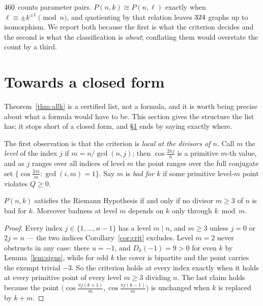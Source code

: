 \begin{remark}
$460$ counts parameter pairs. $P(n,k)\cong P(n,\ell)$ exactly when
$\ell\equiv\pm k^{\pm1}\pmod n$, and quotienting by that relation leaves
$324$ graphs up to isomorphism. We report both because the first is
what the criterion decides and the second is what the classification is
\emph{about}; conflating them would overstate the count by a third.
\end{remark}

\section{Towards a closed form}\label{sec:closed}

Theorem~\ref{thm:allk} is a certified list, not a formula, and it is worth
being precise about what a formula would have to be. This section gives the
structure the list has; it stops short of a closed form, and \S\ref{sec:closed}
ends by saying exactly where.

The first observation is that the criterion is \emph{local at the divisors of
$n$}. Call $m$ the \emph{level} of the index $j$ if $m=n/\gcd(n,j)$; then
$\cos\frac{2\pi j}{n}$ is a primitive $m$-th value, and as $j$ ranges over all
indices of level $m$ the point ranges over the full conjugate set
$\{\cos\frac{2\pi i}{m}:\gcd(i,m)=1\}$. Say $m$ is \emph{bad for $k$} if some
primitive level-$m$ point violates $Q\ge0$.

\begin{theorem}[Locality]\label{thm:local}
$P(n,k)$ satisfies the Riemann Hypothesis if and only if no divisor $m\ge3$ of
$n$ is bad for $k$. Moreover badness at level $m$ depends on $k$ only through
$k\bmod m$.
\end{theorem}

\begin{proof}
Every index $j\in\{1,\dots,n-1\}$ has a level $m\mid n$, and $m\ge3$ unless
$j=0$ or $2j=n$ --- the two indices Corollary~\ref{cor:crit} excludes. Level
$m=2$ never obstructs in any case: there $u=-1$, and $D_k(-1)=9>0$ for even $k$
by Lemma~\ref{lem:signs}, while for odd $k$ the cover is bipartite and the point
carries the exempt trivial $-3$. So the criterion holds at every index exactly
when it holds at every primitive point of every level $m\ge3$ dividing $n$. The
last claim holds because the point
$\bigl(\cos\frac{\pi j(k+1)}{m},\cos\frac{\pi j(k-1)}{m}\bigr)$ is unchanged
when $k$ is replaced by $k+m$.
\end{proof}

